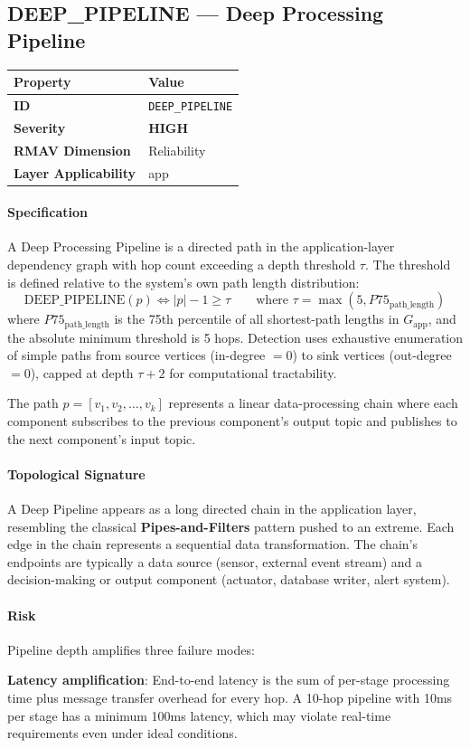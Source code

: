 \documentclass[11pt]{article}
\makeatletter
\newcommand{\HIGH}{\textcolor{orange!80!black}{\textbf{HIGH}}}
\newcommand{\patternprop}[4]{%
  \begin{center}
  \begin{tabular}{@{}ll@{}}
  \toprule
  \textbf{Property} & \textbf{Value} \\
  \midrule
  \textbf{ID} & \texttt{#1} \\
  \textbf{Severity} & #2 \\
  \textbf{RMAV Dimension} & #3 \\
  \textbf{Layer Applicability} & #4 \\
  \bottomrule
  \end{tabular}
  \end{center}
}
\makeatother
\begin{document}
\subsection{DEEP\_PIPELINE --- Deep Processing Pipeline}
\patternprop{DEEP\_PIPELINE}{\HIGH}{Reliability}{app}

\paragraph{Specification}
A Deep Processing Pipeline is a directed path in the application-layer dependency graph with hop count exceeding a depth threshold $\tau$. The threshold is defined relative to the system's own path length distribution:
\[
\mathrm{DEEP\_PIPELINE}(p) \Leftrightarrow |p| - 1 \ge \tau \qquad \text{where } \tau = \max(5, P75_{\text{path\_length}})
\]
where $P75_{\text{path\_length}}$ is the 75th percentile of all shortest-path lengths in $G_{\text{app}}$, and the absolute minimum threshold is 5 hops. Detection uses exhaustive enumeration of simple paths from source vertices (in-degree $= 0$) to sink vertices (out-degree $= 0$), capped at depth $\tau + 2$ for computational tractability.

The path $p = [v_1, v_2, \ldots, v_k]$ represents a linear data-processing chain where each component subscribes to the previous component's output topic and publishes to the next component's input topic.

\paragraph{Topological Signature}
A Deep Pipeline appears as a long directed chain in the application layer, resembling the classical \textbf{Pipes-and-Filters} pattern pushed to an extreme. Each edge in the chain represents a sequential data transformation. The chain's endpoints are typically a data source (sensor, external event stream) and a decision-making or output component (actuator, database writer, alert system).

\paragraph{Risk}
Pipeline depth amplifies three failure modes:

\textbf{Latency amplification}: End-to-end latency is the sum of per-stage processing time plus message transfer overhead for every hop. A 10-hop pipeline with 10ms per stage has a minimum 100ms latency, which may violate real-time requirements even under ideal conditions.
\end{document}
